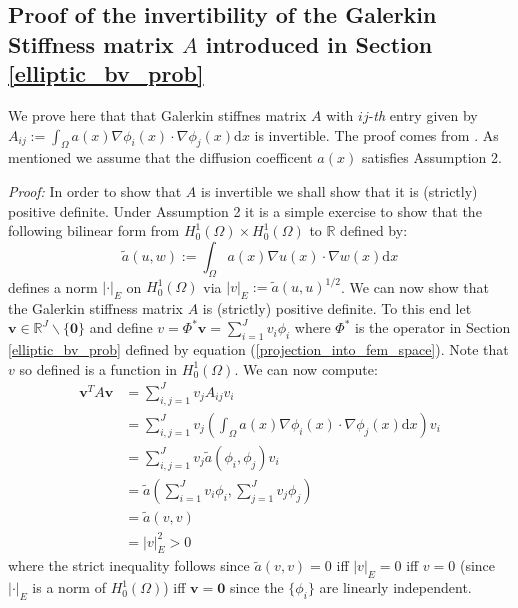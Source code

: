 \subsection{Proof of the invertibility of the Galerkin Stiffness matrix $A$ introduced in Section \textcolor{blue}{\ref{elliptic_bv_prob}}}

We prove here that that Galerkin stiffnes matrix $A$ with $ij$-\textit{th} entry given by $A_{ij}:=\int_{\Omega}a(x)\nabla\phi_{i}(x)\cdot\nabla\phi_{j}(x)\mathrm{d}x$ is invertible. The proof comes from \textcolor{blue}{\citep{lord2014introduction}}. As mentioned we assume that the diffusion coefficent $a(x)$ satisfies Assumption 2.

\noindent \textit{Proof:} In order to show that $A$ is invertible we shall show that it is (strictly) positive definite. Under Assumption 2 it is a simple exercise to show that the following bilinear form from $H_{0}^{1}(\Omega)\times H_{0}^{1}(\Omega)$ to $\mathbb{R}$ defined by:
\begin{equation}
    \tilde{a}(u,w):=\int_{\Omega}a(x)\nabla u(x)\cdot\nabla w(x)\mathrm{d}x
\end{equation}
defines a norm $|\boldsymbol{\cdot}|_{E}$ on $H_{0}^{1}(\Omega)$ via $|v|_{E}:=\tilde{a}(u,u)^{1/2}$. We can now show that the Galerkin stiffness matrix $A$ is (strictly) positive definite. To this end let $\mathbf{v}\in\mathbb{R}^{J}\backslash\{\mathbf{0}\}$ and define $v=\Phi^{*}\mathbf{v}=\sum_{i=1}^{J}v_{i}\phi_{i}$ where $\Phi^{*}$ is the operator in Section \textcolor{blue}{\ref{elliptic_bv_prob}} defined by equation (\ref{projection_into_fem_space}). Note that $v$ so defined is a function in $H_{0}^{1}(\Omega)$. We can now compute:
\begin{align*}
    \mathbf{v}^{T}A\mathbf{v} &= \sum_{i,j=1}^{J}v_{j}A_{ij}v_{i} \\
    &=\sum_{i,j=1}^{J}v_{j}(\int_{\Omega}a(x)\nabla\phi_{i}(x)\cdot\nabla\phi_{j}(x)\mathrm{d}x)v_{i} \\
    &=\sum_{i,j=1}^{J}v_{j}\tilde{a}(\phi_{i},\phi_{j})v_{i} \\
    &=\tilde{a}\left(\sum_{i=1}^{J}v_{i}\phi_{i},\sum_{j=1}^{J}v_{j}\phi_{j}\right) \\
    &= \tilde{a}(v,v) \\
    &= |v|_{E}^{2}>0
\end{align*}
where the strict inequality follows since $\tilde{a}(v,v)=0$ iff $|v|_{E}=0$ iff $v=0$ (since $|\boldsymbol{\cdot}|_{E}$ is a norm of $H_{0}^{1}(\Omega)$) iff $\mathbf{v}=\mathbf{0}$ since the $\{\phi_{i}\}$ are linearly independent. \qedsymbol

